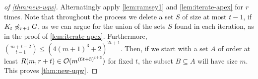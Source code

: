 \begin{proof}[of \cref{thm:new-uqw}]
Alternatingly apply \cref{lem:ramsey1} and \cref{lem:iterate-apex} 
for $r$ times. Note that throughout the process we delete a set $S$ of 
size at most $t-1$, if $K_t\not\preccurlyeq_{r+1} G$, as we can argue 
for the union of the sets $S$ found in each iteration, as in the proof
of \cref{lem:iterate-apex}. Furthermore, 
$\binom{m+t-2}{t-1}\leq (4(m+1)^3+2)^{2t+1}$. 
Then, if we start with a set $A$ of order at least 
$R(m,r+t)\in\mathcal{O}(m^{(6t+3)^{t+3}})$ for fixed $t$, the 
subset $B\subseteq A$ will have size $m$. This proves \cref{thm:new-uqw}. 
\end{proof}

